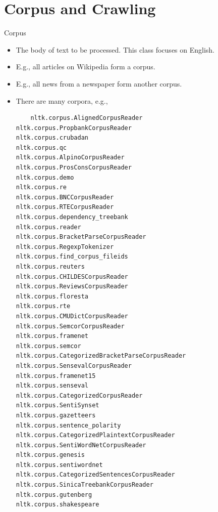 \documentclass[11pt, handout]{beamer}
\begin{document}
\section{Corpus and Crawling}

\begin{frame}[fragile]{Corpus}
 \begin{itemize}
  \item The body of text to be processed. This class focuses on English. 
  \item E.g., all articles on Wikipedia form a corpus. 
  \item E.g., all news from a newspaper form another corpus. 
  \item There are many corpora, e.g., 
  
{\tiny
   \begin{verbatim}
    nltk.corpus.AlignedCorpusReader                         nltk.corpus.PropbankCorpusReader                        nltk.corpus.crubadan                                    nltk.corpus.qc
nltk.corpus.AlpinoCorpusReader                          nltk.corpus.ProsConsCorpusReader                        nltk.corpus.demo                                        nltk.corpus.re
nltk.corpus.BNCCorpusReader                             nltk.corpus.RTECorpusReader                             nltk.corpus.dependency_treebank                         nltk.corpus.reader
nltk.corpus.BracketParseCorpusReader                    nltk.corpus.RegexpTokenizer                             nltk.corpus.find_corpus_fileids                         nltk.corpus.reuters
nltk.corpus.CHILDESCorpusReader                         nltk.corpus.ReviewsCorpusReader                         nltk.corpus.floresta                                    nltk.corpus.rte
nltk.corpus.CMUDictCorpusReader                         nltk.corpus.SemcorCorpusReader                          nltk.corpus.framenet                                    nltk.corpus.semcor
nltk.corpus.CategorizedBracketParseCorpusReader         nltk.corpus.SensevalCorpusReader                        nltk.corpus.framenet15                                  nltk.corpus.senseval
nltk.corpus.CategorizedCorpusReader                     nltk.corpus.SentiSynset                                 nltk.corpus.gazetteers                                  nltk.corpus.sentence_polarity
nltk.corpus.CategorizedPlaintextCorpusReader            nltk.corpus.SentiWordNetCorpusReader                    nltk.corpus.genesis                                     nltk.corpus.sentiwordnet
nltk.corpus.CategorizedSentencesCorpusReader            nltk.corpus.SinicaTreebankCorpusReader                  nltk.corpus.gutenberg                                   nltk.corpus.shakespeare

\end{verbatim}}
\end{itemize}
\end{frame}
\end{document}
